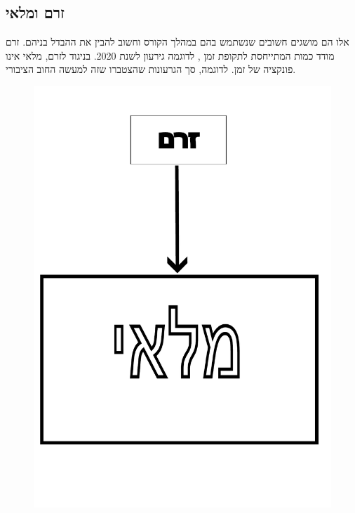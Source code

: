 \documentclass[a4paper,12pt]{article}
\begin{document}
\begin{RTL}
\begin{hebrew}
\section{זרם ומלאי}
אלו הם מושגים חשובים שנשתמש בהם במהלך הקורס וחשוב להבין את ההבדל בניהם. זרם מודד כמות המתייחסת לתקופת זמן , לדוגמה גירעון לשנת 2020. בניגוד לזרם, מלאי אינו פונקציה של זמן. לדוגמה, סך הגרעונות שהצטברו שזה למעשה החוב הציבורי. 
\begin{figure}[H]
    \centering
    \includegraphics[width=0.5\linewidth]{drawing.pdf}
\end{figure}
\end{hebrew}    
\end{RTL}
\end{document}
